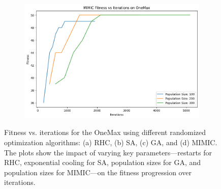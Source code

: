 \begin{figure}[htbp]
\begin{subfigure}[b]{0.49\textwidth}
        \caption{}
        \label{fig:onemaxga}
    \end{subfigure}
    \hfill
    \begin{subfigure}[b]{0.49\textwidth}
        \centering
        \includegraphics[width=\textwidth]{image/onemax/mimic.png}
        \caption{}
        \label{fig:onemaxmimic}
    \end{subfigure}
    \caption{Fitness vs. iterations for the OneMax using different randomized optimization algorithms: (a) RHC, (b) SA, (c) GA, and (d) MIMIC. The plots show the impact of varying key parameters—restarts for RHC, exponential cooling for SA, population sizes for GA, and population sizes for MIMIC—on the fitness progression over iterations.}
    \label{fig:onemaxgrid}
\end{figure}

